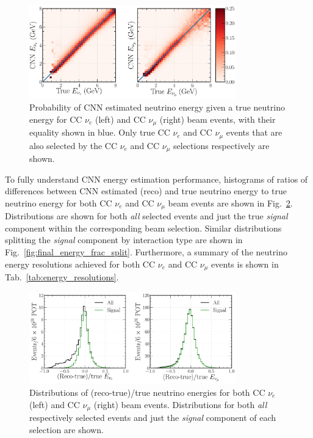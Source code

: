 \begin{figure} %
    \includegraphics[width=0.8\textwidth]{diagrams/6-cvn/chipsnet/final_energy_2d.pdf}
    \caption[Probability of CNN estimated neutrino energy given a true neutrino energy.]
    {Probability of CNN estimated neutrino energy given a true neutrino energy for CC $\nu_{e}$
        (left) and CC $\nu_{\mu}$ (right) beam events, with their equality shown in blue. Only
        true CC $\nu_{e}$ and CC $\nu_{\mu}$ events that are also selected by the CC $\nu_{e}$ and
        CC $\nu_{\mu}$ selections respectively are shown.}
    \label{fig:final_energy_2d}
\end{figure}

To fully understand CNN energy estimation performance, histograms of ratios of differences between
CNN estimated (reco) and true neutrino energy to true neutrino energy for both CC $\nu_{e}$ and CC
$\nu_{\mu}$ beam events are shown in Fig.~\ref{fig:final_energy_frac}. Distributions are shown for
both \emph{all} selected events and just the true \emph{signal} component within the corresponding
beam selection. Similar distributions splitting the \emph{signal} component by interaction type
are shown in Fig.~\ref{fig:final_energy_frac_split}. Furthermore, a summary of the neutrino energy
resolutions achieved for both CC $\nu_{e}$ and CC $\nu_{\mu}$ events is shown in
Tab.~\ref{tab:energy_resolutions}.

\begin{figure} %
    \includegraphics[width=0.8\textwidth]{diagrams/6-cvn/chipsnet/final_energy_frac.pdf}
    \caption[Distributions of (reco-true)/true neutrino energies.]
    {Distributions of (reco-true)/true neutrino energies for both CC $\nu_{e}$ (left) and CC
        $\nu_{\mu}$ (right) beam events. Distributions for both \emph{all} respectively selected
        events and just the \emph{signal} component of each selection are shown.}
    \label{fig:final_energy_frac}
\end{figure}

